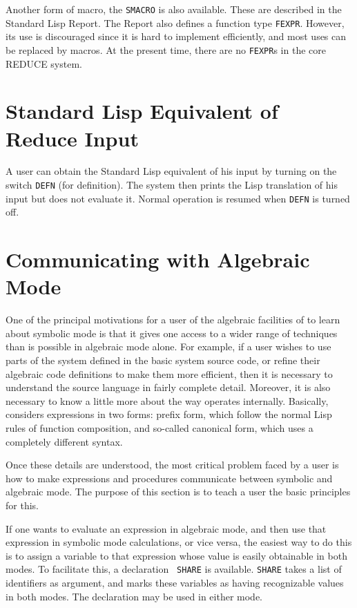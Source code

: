 Another form of macro, the {\tt SMACRO} is also available.
These are described in the Standard Lisp Report.  The Report also defines
a function type {\tt FEXPR}.
However, its use is discouraged since it is hard to implement efficiently,
and most uses can be replaced by macros.  At the present time, there are
no {\tt FEXPR}s in the core REDUCE system.

\section{Standard Lisp Equivalent of Reduce Input}

A user can obtain the Standard Lisp equivalent of his {\REDUCE} input by
turning on the switch {\tt DEFN} (for definition).  The
system then prints the Lisp translation of his input but does not evaluate
it.  Normal operation is resumed when {\tt DEFN} is turned off.

\section{Communicating with Algebraic Mode}

One of the principal motivations for a user of the algebraic facilities of
{\REDUCE} to learn about symbolic mode is that it
gives one access to a wider range of techniques than is possible in
algebraic mode alone.  For example, if a user
wishes to use parts of the system defined in the basic system source code,
or refine their algebraic code definitions to make them more efficient,
then it is necessary to understand the source language in fairly complete
detail.  Moreover, it is also necessary to know a little more about the
way {\REDUCE} operates internally.  Basically, {\REDUCE} considers
expressions in two forms: prefix form, which follow the normal Lisp rules
of function composition, and so-called canonical form, which uses a
completely different syntax.

Once these details are understood, the most critical problem faced by a
user is how to make expressions and procedures communicate between symbolic
and algebraic mode. The purpose of this section is to teach a user the
basic principles for this.

If one wants to evaluate an expression in algebraic mode, and then use
that expression in symbolic mode calculations, or vice versa, the easiest
way to do this is to assign a variable to that expression whose value is
easily obtainable in both modes.  To facilitate this, a declaration {\tt
SHARE} is available. {\tt SHARE} takes a list of
identifiers as argument, and marks these variables as having recognizable
values in both modes.  The declaration may be used in either mode.


